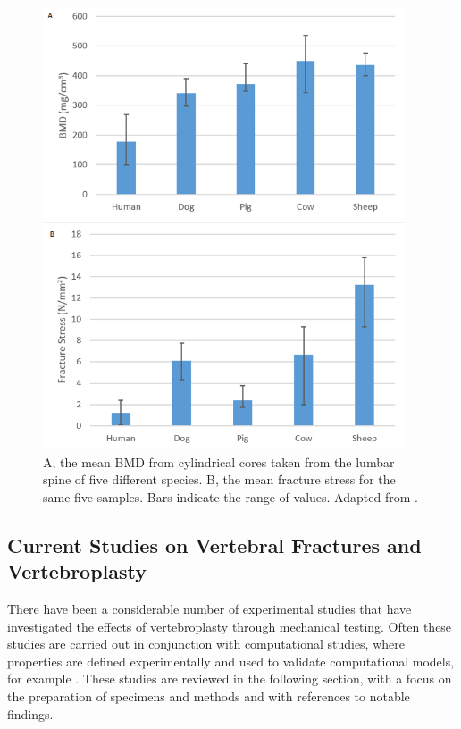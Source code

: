 \begin{figure}[hbt]

\centering
  \includegraphics[width=4.21209in,height=5.15601in]{images/bmdGraph.png}
  \caption{A, the mean BMD from
cylindrical cores taken from the lumbar spine of five different species.
B, the mean fracture stress for the same five samples. Bars indicate the
range of values. Adapted from \cite{aerssens1998interspecies}.}
\label{fig:bmdgraph}
\end{figure}

\subsection{Current Studies on Vertebral Fractures and Vertebroplasty
}\label{current-studies-on-vertebral-fractures-and-vertebroplasty}

There have been a considerable number of experimental studies that have investigated the
effects of vertebroplasty through mechanical testing. Often
these studies are carried out in conjunction with computational studies,
where properties are defined experimentally and used to validate
computational models, for example \cite{Wijayathunga2008}. These studies are reviewed in the following section, with a focus on the preparation of
specimens and
methods and with references to notable findings.

